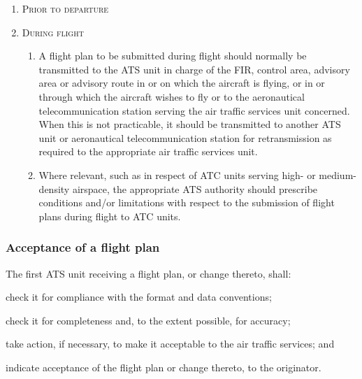 \documentclass[../main.tex]{subfiles}
\begin{document}
    \begin{enumerate}[itemsep=0.2cm]\centering
        \item \textsc{Prior to departure}

        \item \textsc{During flight}
        \begin{enumerate}
            \item A flight plan to be submitted during flight should normally be transmitted to the ATS unit in charge of the FIR, control area, advisory area or advisory route in or on which the aircraft is flying, or in or through which the aircraft wishes to fly or to the aeronautical telecommunication station serving the air traffic services unit concerned. When this is not practicable, it should be transmitted to another ATS unit or aeronautical telecommunication station for retransmission as required to the appropriate air traffic services unit.
            \item Where relevant, such as in respect of ATC units serving high- or medium-density airspace, the appropriate ATS authority should prescribe conditions and/or limitations with respect to the submission of flight plans during flight to ATC units.

        \end{enumerate}
    \end{enumerate}

    \subsubsection{Acceptance of a flight plan}

    The first ATS unit receiving a flight plan, or change thereto, shall:

    \begin{enumalph}
        \item check it for compliance with the format and data conventions;
        \item check it for completeness and, to the extent possible, for accuracy;
        \item take action, if necessary, to make it acceptable to the air traffic services; and
        \item indicate acceptance of the flight plan or change thereto, to the originator.
    \end{enumalph}
\end{document}
